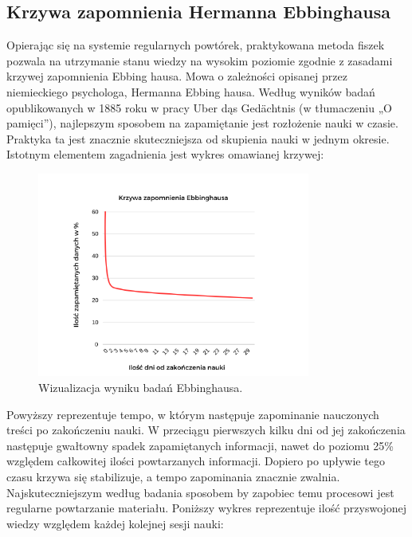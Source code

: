 \subsection{Krzywa zapomnienia Hermanna Ebbinghausa}

Opierając się na systemie regularnych powtórek, praktykowana metoda fiszek pozwala na utrzymanie stanu wiedzy na wysokim poziomie zgodnie z zasadami krzywej zapomnienia Ebbing hausa. Mowa o zależności opisanej przez niemieckiego psychologa, Hermanna Ebbing hausa. Według wyników badań opublikowanych w 1885 roku w pracy \cite{1} Uber dąs Gedächtnis (w tłumaczeniu „O pamięci”), najlepszym sposobem na zapamiętanie jest rozłożenie nauki w czasie. Praktyka ta jest znacznie skuteczniejsza od skupienia nauki w jednym okresie. Istotnym elementem zagadnienia jest wykres omawianej krzywej:

\begin{figure}[H]
    \centering
    \includegraphics[width=0.8\textwidth]{chapters/chapter_2/krzywa1.png}
    \caption{Wizualizacja wyniku badań Ebbinghausa.}
    \label{img:krzywa1}
\end{figure}

Powyższy reprezentuje tempo, w którym następuje zapominanie nauczonych treści po zakończeniu nauki. W przeciągu pierwszych kilku dni od jej zakończenia następuje gwałtowny spadek zapamiętanych informacji, nawet do poziomu 25\% względem całkowitej ilości powtarzanych informacji. Dopiero po upływie tego czasu krzywa się stabilizuje, a tempo zapominania znacznie zwalnia. Najskuteczniejszym według badania sposobem by zapobiec temu procesowi jest regularne powtarzanie materiału. Poniższy wykres reprezentuje ilość przyswojonej wiedzy względem każdej kolejnej sesji nauki:

